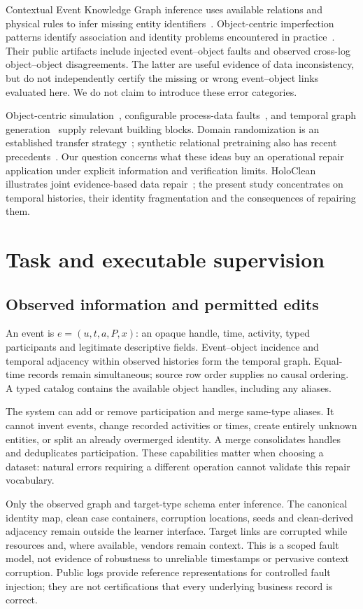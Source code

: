 \documentclass[11pt]{article}
\begin{document}
Contextual Event Knowledge Graph inference uses available relations and physical rules to infer missing entity identifiers~\cite{ekginference}. Object-centric imperfection patterns identify association and identity problems encountered in practice~\cite{ocip}. Their public artifacts include injected event--object faults and observed cross-log object--object disagreements. The latter are useful evidence of data inconsistency, but do not independently certify the missing or wrong event--object links evaluated here. We do not claim to introduce these error categories.

Object-centric simulation~\cite{ocsim}, configurable process-data faults~\cite{flawd}, and temporal graph generation~\cite{tigger} supply relevant building blocks. Domain randomization is an established transfer strategy~\cite{domainrandomization}; synthetic relational pretraining also has recent precedents~\cite{plurel,rdbpfn}. Our question concerns what these ideas buy an operational repair application under explicit information and verification limits. HoloClean illustrates joint evidence-based data repair~\cite{holoclean}; the present study concentrates on temporal histories, their identity fragmentation and the consequences of repairing them.

\section{Task and executable supervision}
\subsection{Observed information and permitted edits}
An event is $e=(u,t,a,P,x)$: an opaque handle, time, activity, typed participants and legitimate descriptive fields. Event--object incidence and temporal adjacency within observed histories form the temporal graph. Equal-time records remain simultaneous; source row order supplies no causal ordering. A typed catalog contains the available object handles, including any aliases.

The system can add or remove participation and merge same-type aliases. It cannot invent events, change recorded activities or times, create entirely unknown entities, or split an already overmerged identity. A merge consolidates handles and deduplicates participation. These capabilities matter when choosing a dataset: natural errors requiring a different operation cannot validate this repair vocabulary.

Only the observed graph and target-type schema enter inference. The canonical identity map, clean case containers, corruption locations, seeds and clean-derived adjacency remain outside the learner interface. Target links are corrupted while resources and, where available, vendors remain context. This is a scoped fault model, not evidence of robustness to unreliable timestamps or pervasive context corruption. Public logs provide reference representations for controlled fault injection; they are not certifications that every underlying business record is correct.
\end{document}
